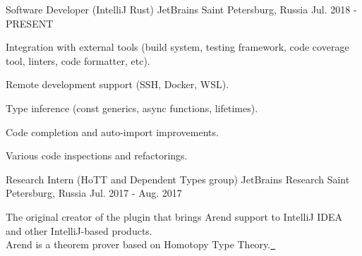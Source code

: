 

\begin{cventries}

  \cventry
    {Software Developer (IntelliJ Rust)} %
    {JetBrains} %
    {Saint Petersburg, Russia} %
    {Jul. 2018 - PRESENT} %
    {
      \begin{cvitems} %
        \item {Integration with external tools (build system, testing framework, code coverage tool, linters, code formatter, etc).}
        \item {Remote development support (SSH, Docker, WSL).}
        \item {Type inference (const generics, async functions, lifetimes).}
        \item {Code completion and auto-import improvements.}
        \item {Various code inspections and refactorings.}
      \end{cvitems}
    }

  \cventry
    {Research Intern (HoTT and Dependent Types group)} %
    {JetBrains Research} %
    {Saint Petersburg, Russia} %
    {Jul. 2017 - Aug. 2017} %
    {
      \begin{cvitems} %
        \item {The original creator of the plugin that brings Arend support to IntelliJ IDEA and other IntelliJ-based products. \\ Arend is a theorem prover based on Homotopy Type Theory.\href{https://github.com/JetBrains/intellij-arend}{\ \faGithub}}
      \end{cvitems}
    }


\end{cventries}
